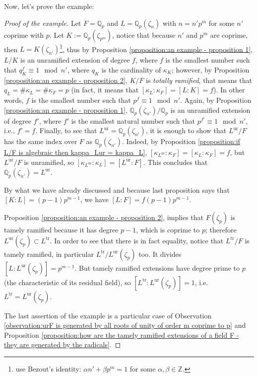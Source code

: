 \documentclass[12pt]{article}
\theoremstyle{plain}
\theoremstyle{definition}
\newcommand{\integers}{\mathbb{Z}}
\newcommand{\padics}{\mathbb{Q}_p}
\newcommand{\ur}[1]{{#1}^{\operatorname{ur}}}
\newcommand{\tr}[1]{{#1}^{\operatorname{tr}}}
\begin{document}
Now, let's prove the example:
\begin{proof}[Proof of the example]
Let $F = \padics$ and $L = \padics (\zeta_n)$ with $n = n' p^m$ for some $n'$ coprime with $p$. Let $K := \padics (\zeta_{p^m})$, notice that because $n'$ and $p^m$ are coprime, then $L = K (\zeta_{n'})$\footnote{use Bezout's identity: $\alpha n' + \beta p^m = 1$ for some $\alpha,\beta \in \integers$.}, thus by Proposition \ref{proposition:an example - proposition 1}, $L / K$ is an unramified extension of degree $f$, where $f$ is the smallest number such that $q_K^f \equiv 1 \mod n'$, where $q_K$ is the cardinality of $\kappa_K$; however, by Proposition \ref{proposition:an example - proposition 2}, $K/F$ is \textit{totally ramified}, that means that $q_L = \# \kappa_L = \# \kappa_{F} = p$ (in fact, it means that $[\kappa_L : \kappa_F] = [L : K ] = f$). In other words, $f$ is the smallest number such that $p^f \equiv 1 \mod n'$. Again, by Proposition \ref{proposition:an example - proposition 1}, $\padics (\zeta_{n'})/\padics$ is an unramified extension of degree $f'$, where $f'$ is the smallest natural number such that $p^{f'} \equiv 1 \mod n'$, i.e., $ f' = f$. Finally, to see that $\ur L = \padics (\zeta_{n'})$, it is enough to show that $\ur L /F$ has the same index over $F$ as $\padics (\zeta_{n'})$. Indeed, by Proposition \ref{proposition:if L/F is algebraic then kappa_Lur = kappa_L}, $[\kappa_{\ur L} : \kappa_F] = [\kappa_L : \kappa_F] = f$, but $\ur L / F$ is unramified, so $[\kappa_{\ur L }: \kappa_L] = [\ur L : F]$. This concludes that $\padics (\zeta_{n'}) = \ur L$.

\bigskip

By what we have already discussed and because last proposition says that $[K: L] = (p-1)p^{m-1}$, we have $[L : F] = f (p-1)p^{m-1}$.

Proposition \ref{proposition:an example - proposition 2}, implies that $F ( \zeta_p)$ is tamely ramified because it has degree $p-1$, which is coprime to $p$; therefore $\ur L (\zeta_p) \subset \tr L$. In order to see that there is in fact equality, notice that $\tr L/ F$ is tamely ramified, in particular $\tr L/ \ur L (\zeta_p) $ too. It divides $[L : \ur L (\zeta_p)] = p^{m-1}$. But tamely ramified extensions have degree prime to $p$ (the characteristic of its residual field), so $[\tr L : \ur L (\zeta_p)] = 1$, i.e. $\tr L = \ur L (\zeta_p)$.

\bigskip

The last assertion of the example is a particular case of Observation \ref{observation:urF is generated by all roots of unity of order m coprime to p} and Proposition \ref{proposition:how are the tamely ramified extensions of a field F - they are generated by the radicals}.
\end{proof}
\end{document}
